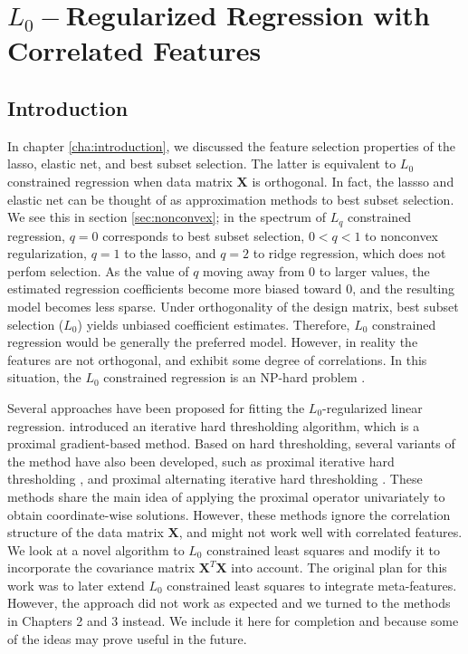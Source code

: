 \chapter{\texorpdfstring{$L_0-$}{Lg}Regularized Regression with Correlated Features}
\label{cha:L0}

\section{Introduction}
In chapter \ref{cha:introduction},  we discussed the feature selection properties of the lasso, elastic net, and best subset selection. The latter is equivalent to $L_0$ constrained regression when data matrix $\bm{X}$ is orthogonal. In fact, the lassso and elastic net can be thought of as approximation methods to best subset selection. We see this in section \ref{sec:nonconvex}; in the spectrum of $L_q$ constrained regression, $q=0$ corresponds to best subset selection, $0<q<1$ to nonconvex regularization, $q=1$ to the lasso, and $q=2$ to ridge regression, which does not perfom selection. As the value of $q$ moving away from 0 to larger values, the estimated regression coefficients become more biased toward 0, and the resulting model becomes less sparse. Under orthogonality of the design matrix, best subset selection ($L_0$) yields unbiased coefficient estimates. Therefore, $L_0$ constrained regression would be generally the preferred model. However, in reality the features are not orthogonal, and exhibit some degree of correlations. In this situation, the $L_0$ constrained regression is an NP-hard problem \citep{huo2007stepwise}. 

Several approaches have been proposed for fitting the $L_0$-regularized linear regression. \cite{blumensath2008iterative} introduced an iterative hard thresholding algorithm, which is a proximal gradient-based method. Based on hard thresholding, several variants of the method have also been developed, such as proximal iterative hard thresholding \citep{zhang2019new}, and proximal alternating iterative hard thresholding \citep{yang2017proximal}. These methods share the main idea of applying the proximal operator univariately to obtain coordinate-wise solutions. However, these methods ignore the correlation structure of the data matrix $\bm{X}$, and might not work well with correlated features. We look at a novel algorithm to $L_0$ constrained least squares  and modify it to incorporate the covariance matrix $\bm{X}^T\bm{X}$ into account. The original plan for this work was to later extend $L_0$ constrained least squares to integrate meta-features. However, the approach did not work as expected and we turned to the methods in Chapters 2 and 3 instead. We include it here for completion and because some of the ideas may prove useful in the future.

